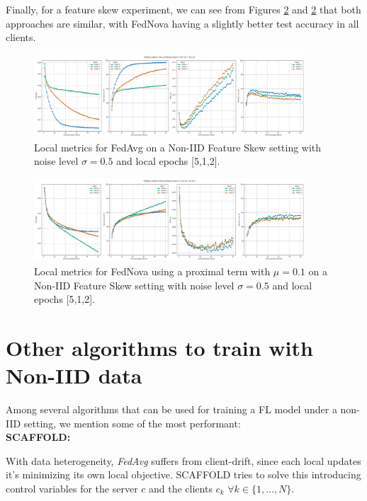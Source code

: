 Finally, for a feature skew experiment, we can see from Figures \ref{fig:FedNova_Noise_LE_512} and \ref{fig:FedNova_Noise_LE_512} that both approaches are similar, with FedNova having a slightly better test accuracy in all clients.
\begin{figure}[H]
  \centering
  \includegraphics[width=0.9\textwidth]{figures/2-Federated_Learning/FedAvg_Noise_LE_512.png}
  \caption{Local metrics for FedAvg  on a Non-IID Feature Skew setting with noise level $\sigma=0.5$  and local epochs [5,1,2].}
  \label{fig:FedAvg_Noise_LE_512}
\end{figure}


\begin{figure}[H]
  \centering
  \includegraphics[width=0.9\textwidth]{figures/2-Federated_Learning/FedNova_Noise_LE_512.png}
  \caption{Local metrics for FedNova using a proximal term with $\mu=0.1$ on a Non-IID Feature Skew setting with noise level $\sigma=0.5$ and local epochs [5,1,2].}
  \label{fig:FedNova_Noise_LE_512}
\end{figure}

\section{Other algorithms to train with Non-IID data}

Among several algorithms that can be used for training a FL model under a non-IID setting, we mention some of the most performant:\\

\textbf{SCAFFOLD:}

With data heterogeneity, \textit{FedAvg} suffers from client-drift, since each local updates it's minimizing its own local objective. SCAFFOLD tries to solve this introducing control variables for the server $c$ and the clients $c_k$ $\forall k \in \{1,\dots, N\}$.

